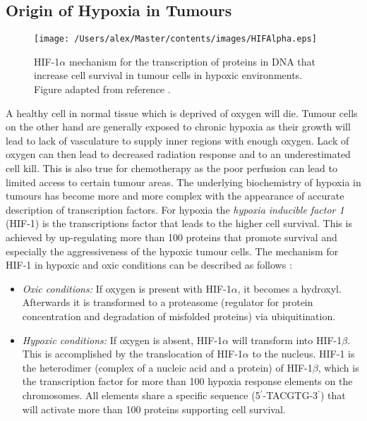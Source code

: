 \subsection{Origin of Hypoxia in Tumours}\label{chap:hypoxiaorigin}
\begin{figure}[tb]
\centering
\texttt{[image: /Users/alex/Master/contents/images/HIFAlpha.eps]}
\caption{HIF-1$\alpha$ mechanism for the transcription of proteins in DNA that increase cell survival in tumour cells in hypoxic environments. Figure adapted from reference \cite{pmid18523070}.}
\label{fig:HIFAlpha}
\end{figure}
A healthy cell in normal tissue which is deprived of oxygen will die. Tumour cells on the other hand are generally exposed to chronic hypoxia as their growth will lead to lack of vasculature to supply inner regions with enough oxygen. Lack of oxygen can then lead to decreased radiation response and to an underestimated cell kill. This is also true for chemotherapy as the poor perfusion can lead to limited access to certain tumour areas. The underlying biochemistry of hypoxia in tumours has become more and more complex with the appearance of accurate description of transcription factors. For hypoxia the \textit{hypoxia inducible factor 1} (HIF-1) is the transcriptions factor that leads to the higher cell survival. This is achieved by up-regulating more than 100 proteins that promote survival and especially the aggressiveness of the hypoxic tumour cells. The mechanism for HIF-1 in hypoxic and oxic conditions can be described as follows \cite{pmid13130303}:
\begin{itemize}
\item \textit{Oxic conditions: }If oxygen is present with HIF-1$\alpha$, it becomes a hydroxyl. Afterwards it is transformed to a proteasome (regulator for protein concentration and degradation of misfolded proteins) via ubiquitination. 
\item \textit{Hypoxic conditions: } If oxygen is absent, HIF-1$\alpha$ will transform into HIF-1$\beta$. This is accomplished by the translocation of HIF-1$\alpha$ to the nucleus. HIF-1 is the heterodimer (complex of a nucleic acid and a protein) of HIF-1$\beta$, which is the transcription factor for more than 100 hypoxia response elements on the chromosomes. All elements share a specific sequence (5$^\prime$-TACGTG-3$^\prime$) that will activate more than 100 proteins supporting cell survival.
\end{itemize}
